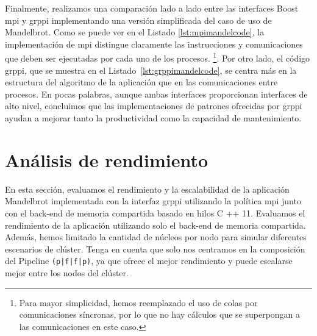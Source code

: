 Finalmente, realizamos una comparación lado a lado entre las interfaces Boost \acrshort{mpi} y \acrshort{grppi} implementando una versión simplificada del caso de uso de Mandelbrot. %
Como se puede ver en el Listado \ref{lst:mpimandelcode}, la implementación de \acrshort{mpi} distingue claramente las instrucciones y comunicaciones que deben ser ejecutadas por cada uno de los procesos. \footnote{Para mayor simplicidad, hemos reemplazado el uso de colas por comunicaciones síncronas, por lo que no hay cálculos que se superpongan a las comunicaciones en este caso.}. Por otro lado, el código \acrshort{grppi}, que se muestra en el Listado~\ref{lst:grppimandelcode}, se centra más en la estructura del algoritmo de la aplicación que en las comunicaciones entre procesos.
En pocas palabras, aunque ambas interfaces proporcionan interfaces de alto nivel, concluimos que las implementaciones de patrones ofrecidas por \acrshort{grppi} ayudan a mejorar tanto la productividad como la capacidad de mantenimiento.

\section{Análisis de rendimiento}
\label{sec:analisis_rendimiento}

En esta sección, evaluamos el rendimiento y la escalabilidad de la aplicación Mandelbrot implementada con la interfaz \acrshort{grppi} utilizando la política \acrshort{mpi} junto con el back-end de memoria compartida basado en hilos C ++ 11. Evaluamos el rendimiento de la aplicación utilizando solo el back-end de memoria compartida. Además, hemos limitado la cantidad de núcleos por nodo para simular diferentes escenarios de clúster. Tenga en cuenta que solo nos centramos en la composición del Pipeline \texttt{(p|f|f|p)}, ya que ofrece el mejor rendimiento y puede escalarse mejor entre los nodos del clúster.

